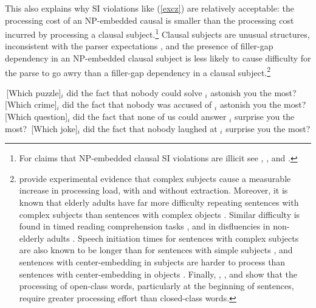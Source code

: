 \documentclass[output=paper
                ,modfonts
                ,nonflat
	        ,collection
	        ,collectionchapter
	        ,collectiontoclongg
 	        ,biblatex
                ,babelshorthands
                ,newtxmath
                ,draftmode
                ,colorlinks, citecolor=brown
]{./langsci/langscibook}
\begin{document}
This also explains why SI violations like  (\ref{excz}) are relatively acceptable: the  processing cost of an NP-embedded 
causal  is smaller than the processing cost incurred by processing a clausal subject.\footnote{For claims that NP-embedded clausal SI violations are illicit see  \citet[42]{lasniksaito},   \citet[796]{colinphillips}, and    \citet[67]{colin_horn}.}  Clausal subjects are unusual structures, inconsistent with the parser expectations \citep{fod74},  and   the presence of filler-gap dependency in an  NP-embedded clausal subject is less likely
to cause  difficulty for the parse to go awry than a  filler-gap dependency in a clausal subject.\footnote{\citet{clausen,clausencuny} provide  experimental evidence that  complex subjects cause  a measurable increase in processing load,  with and without extraction. Moreover,  it is known that 
elderly adults  have far more difficulty repeating sentences with complex subjects than sentences with complex objects  \citep{kemper86}. Similar difficulty is  found in timed reading comprehension tasks  \citep{kynette}, and in   disfluencies in non-elderly adults \citep{clarkwasow}. 
Speech initiation times  for sentences with complex subjects are
also known to be longer than for sentences with 
 simple subjects  \citep{ferreirasubj,tsiam},
 and sentences with center-embedding in subjects 
are harder to process than sentences 
with center-embedding in objects \citep{amy,eady}.
Finally,  \citet{garnsey}, \citet{kutasetal}, and \citet{vanpetten}  show
that the processing of open-class words, particularly at
the beginning of sentences, require
greater processing effort than closed-class words.}


\eal \label{excz}
\ex  \,[Which puzzle]$_i$ did the fact that nobody could solve \spc$_i$ astonish you the most?
\ex \,[Which crime]$_i$ did the fact that nobody was accused of \spc$_i$ astonish you the most?
\ex \,[Which question]$_i$ did the fact that none of us could answer \spc$_i$  surprise you the most?
\ex \,[Which joke]$_i$ did the fact that nobody laughed at \spc$_i$ surprise you the most?
\zl
\end{document}
